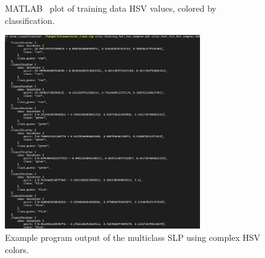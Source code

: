 \documentclass[twoside]{IEEEtran}
\begin{document}
\begin{figure}[!t]
    \hfill
    \hfill
    \caption{MATLAB~\cite{matlab} plot of training data HSV values, colored by classification.}%
    \label{hsv_data}
\end{figure}

\begin{figure}[!t]
    \centering
    \includegraphics[width=0.75\textwidth]{program_demo.png}
    \hfil
    \caption{Example program output of the multiclass SLP using complex HSV colors.}%
    \label{program_output}
\end{figure}

\newpage

\enlargethispage{-2.22in}



\end{document}
